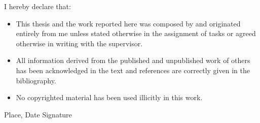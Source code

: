 I hereby declare that:
\begin{itemize}
\item This thesis and the work reported here was composed by and originated entirely from me unless stated otherwise in the assignment of tasks or agreed otherwise in writing with the supervisor.
\item All information derived from the published and unpublished work of others has been acknowledged in the text and references are correctly given in the bibliography. 
\item No copyrighted material has been used illicitly in this work.
\newline
\end{itemize} 
Place, Date \hfill Signature
